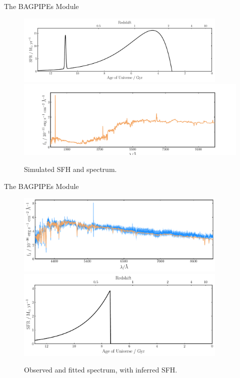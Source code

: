 \documentclass{beamer}
\begin{document}
\begin{frame}{The BAGPIPEs Module}
  \begin{figure}
    \centering
    \includegraphics[width=0.9\textwidth]{model020_sfh}
    \includegraphics[width=\textwidth]{model020_spectrum}
    \caption{Simulated SFH and spectrum.}
  \end{figure}
\end{frame}

\begin{frame}{The BAGPIPEs Module}
  \begin{figure}
    \centering
    \includegraphics[width=0.9\textwidth]{host_hyz_specwerr_fit}
    \includegraphics[width=0.9\textwidth]{host_hyz_specwerr_sfh}
    \caption{Observed and fitted spectrum, with inferred SFH.}
  \end{figure}
\end{frame}
\end{document}
